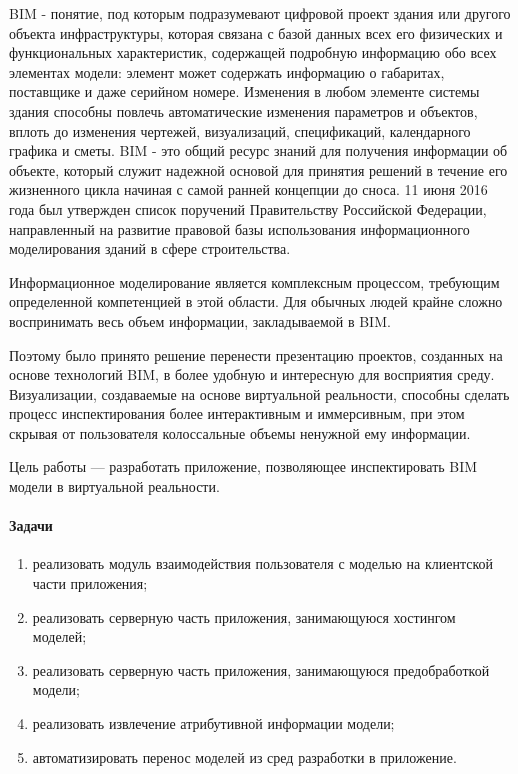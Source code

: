 ﻿
BIM - понятие, под которым подразумевают цифровой проект здания или другого объекта инфраструктуры,
которая связана с базой данных всех его физических и функциональных характеристик,
содержащей подробную информацию обо всех элементах модели:
элемент может содержать информацию о габаритах, поставщике и даже серийном номере. 
Изменения в любом элементе системы здания способны повлечь автоматические изменения  параметров и объектов, 
вплоть до изменения чертежей, визуализаций, спецификаций, календарного графика и сметы.
BIM - это общий ресурс знаний для получения информации об объекте,
который служит надежной основой для принятия решений в течение его жизненного цикла
начиная с самой ранней концепции до сноса.
\cite{nationalBIMfaqs}
11 июня 2016 года был утвержден список поручений Правительству Российской Федерации,
направленный на развитие правовой базы использования
информационного моделирования зданий в сфере строительства.
\cite{kremlinInstraction2016}

Информационное моделирование является комплексным процессом, требующим определенной компетенцией в этой области. 
Для обычных людей крайне сложно воспринимать весь объем информации, закладываемой в BIM.

Поэтому было принято решение перенести презентацию проектов,
созданных на основе технологий BIM, в более удобную и интересную для восприятия среду. 
Визуализации, создаваемые на основе виртуальной реальности,
способны сделать процесс инспектирования более интерактивным и иммерсивным,
при этом скрывая от пользователя колоссальные объемы ненужной ему информации.

Цель работы — разработать приложение, позволяющее инспектировать BIM модели в виртуальной реальности.

\paragraph{Задачи}
\begin{enumerate}
    \item реализовать модуль взаимодействия пользователя с моделью на клиентской части приложения;
    \item реализовать серверную часть приложения, занимающуюся хостингом моделей;
    \item реализовать серверную часть приложения, занимающуюся предобработкой модели;
    \item реализовать извлечение атрибутивной информации модели;
    \item автоматизировать перенос моделей из сред разработки в приложение.
\end{enumerate}

